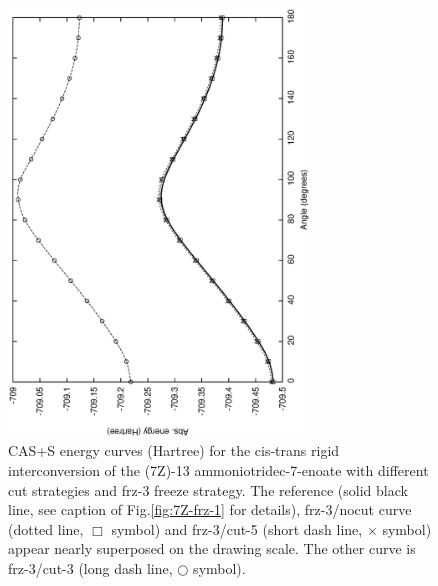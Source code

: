 \begin{figure}[ht]
\begin{center}
\includegraphics[width=8cm,angle=270]{02_localization/images/7Z-frz-3.eps}
\caption{\footnotesize CAS+S energy curves (Hartree) for the cis-trans rigid
interconversion of the (7Z)-13 ammoniotridec-7-enoate with different 
cut strategies and frz-3 freeze strategy. The reference (solid black line,
see caption of Fig.\ref{fig:7Z-frz-1} for details),
frz-3/nocut curve (dotted line, $\Box$ symbol) and frz-3/cut-5 (short
dash line, $\times$ symbol) appear nearly superposed on the drawing
scale. The other curve is frz-3/cut-3 (long dash line, $\bigcirc$ symbol).
}
\label{fig:7Z-frz-3}
\end{center}
\end{figure}
